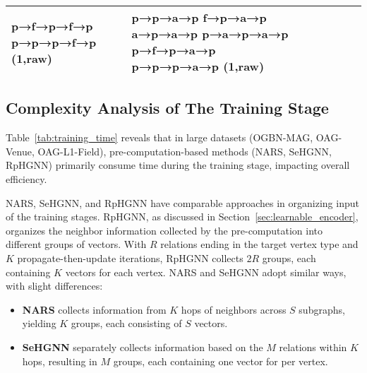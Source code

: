 \documentclass[lettersize,journal]{IEEEtran}
\begin{document}
\begin{table}[!tp]
{\begin{tabular}{|p{18mm}|p{13mm}|p{13mm}|p{13mm}|p{17mm}|p{17mm}|p{17mm}|}
                  p→f→p→f→p \newline
                  p→p→p→f→p \newline 
                  (1,raw)
                  & p→p→a→p \newline
                    f→p→a→p \newline
                    a→p→a→p \newline
                    p→a→p→a→p \newline
                    p→f→p→a→p \newline
                    p→p→p→a→p \newline 
                    (1,raw) \\
      \hline
      \end{tabular}
      }
\end{table}
    

  






\subsection{Complexity Analysis of The Training Stage}


Table~\ref{tab:training_time} reveals that in large datasets (OGBN-MAG, OAG-Venue, OAG-L1-Field), pre-computation-based methods (NARS, SeHGNN, RpHGNN) primarily consume time during the training stage, impacting overall efficiency.


NARS, SeHGNN, and RpHGNN have comparable approaches in organizing input of the training stages. 
RpHGNN, as discussed in Section~\ref{sec:learnable_encoder}, organizes the neighbor information collected by the pre-computation into different groups of vectors. 
With $R$ relations ending in the target vertex type and $K$ propagate-then-update iterations, RpHGNN collects $2R$ groups, each containing $K$ vectors for each vertex.
NARS and SeHGNN adopt similar ways, with slight differences:
\begin{itemize}
\item \textbf{NARS} collects information from $K$ hops of neighbors across $S$ subgraphs, yielding $K$ groups, each consisting of $S$ vectors.
\item \textbf{SeHGNN} separately collects information based on the $M$ relations within $K$ hops, resulting in $M$ groups, each containing one vector for per vertex.
\end{itemize}
\end{document}
